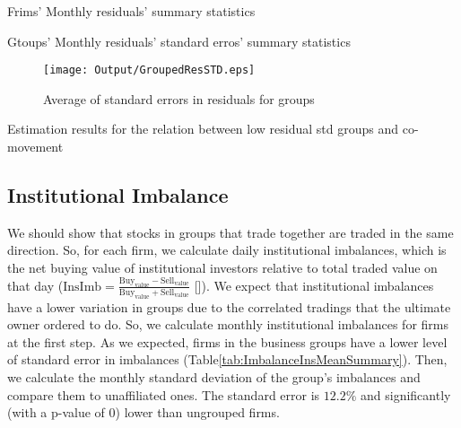{			\begin{table}[htbp]
	\centering
	\caption{Frims' Monthly residuals' summary statistics}
	\label{tab:ResidualTrunSummary}
	\resizebox{0.8\textwidth}{!}{
		
	}
\end{table}	
		\begin{table}[htbp]
			\centering
			\caption{Gtoups' Monthly residuals' standard erros' summary statistics}
			\label{tab:ResidualTrunStdSummary}
			\resizebox{0.8\textwidth}{!}{
				
			}
		\end{table}
\begin{figure}[htbp]
	\centering
	\texttt{[image: Output/GroupedResSTD.eps]}

	\caption{Average of standard errors in residuals for groups}
	\label{fig:GroupedResSTD}
\end{figure}
		\begin{table}[htbp]
			\centering
			\caption{Estimation results for the relation between low residual std groups and co-movement}
			\label{Turnovercrosssection}
			\resizebox{\textwidth}{!}{
				\centering
				
			}			
		\end{table}}




\FloatBarrier

%
%
\subsection{{Institutional Imbalance}}

	We should show that stocks in groups that trade together are traded in the same direction. So, for each firm, we calculate daily institutional imbalances, which is the net buying value of institutional investors relative to total traded value on that day ($ \text{InsImb} = \frac{\text{Buy}_{\text{value}} - \text{Sell}_{\text{value}}}{\text{Buy}_{\text{value}} + \text{Sell}_{\text{value}}} $ [\cite{seasholes2007predictable}]).
		We expect that institutional imbalances have a lower variation in groups due to the correlated tradings that the ultimate owner ordered to do. So, we calculate monthly institutional imbalances for firms at the first step. As we expected, firms in the business groups have a lower level of standard error in  imbalances (Table\ref{tab:ImbalanceInsMeanSummary}). Then, we calculate the monthly standard deviation of the group's imbalances and compare them to unaffiliated ones. The standard error is  $12.2\%$ and significantly (with a p-value of 0) lower than ungrouped firms. 
		
